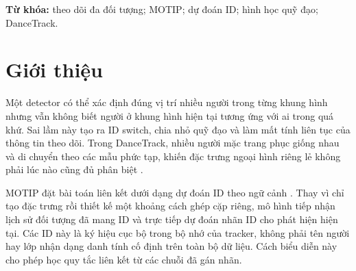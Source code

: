 \begin{abstract}
Theo dõi đa đối tượng đòi hỏi duy trì nhất quán danh tính qua nhiều khung hình, đặc biệt khi các đối tượng có ngoại hình tương tự, giao cắt hoặc bị che khuất. Bài báo này tái hiện phương pháp Multiple Object Tracking as ID Prediction (MOTIP) dựa trên mã nguồn của tác giả, đồng thời đánh giá một nhánh liên kết hình học tường minh. Nhánh bổ sung sử dụng hộp giới hạn của từng ứng viên tại các độ trễ 1, 2, 4 và 8 khung hình để tạo mô tả 66 chiều, sau đó dự đoán điểm tương thích bằng một MLP gồm 25.217 tham số. Điểm hình học được hợp nhất với logit dự đoán ID của MOTIP, trong khi detector được giữ cố định. Thực nghiệm sử dụng các subset lồng nhau chiếm xấp xỉ 5\%, 10\% và 15\% tập huấn luyện DanceTrack, tương ứng 2.090, 4.179 và 6.265 khung hình. Mỗi cấu hình được huấn luyện 10 epoch với ba seed và đánh giá trên toàn bộ 25.508 khung hình validation. Nhánh hình học cải thiện AssA trung bình lần lượt 7.358, 8.821 và 7.525 điểm, với ID switch giảm trong cả chín cặp seed/ngân sách. Kết quả cho thấy hình học đa độ trễ bổ sung một tín hiệu liên kết hữu ích trong các điều kiện được khảo sát. Phạm vi kết luận là học liên kết với detector tiền huấn luyện cố định; thực nghiệm không thay thế đánh giá trên test ẩn hay tái lập toàn bộ chế độ huấn luyện end-to-end của paper gốc.

\end{abstract}
\textbf{Từ khóa:} theo dõi đa đối tượng; MOTIP; dự đoán ID; hình học quỹ đạo; DanceTrack.
\FloatBarrier
\section{Giới thiệu}
Một detector có thể xác định đúng vị trí nhiều người trong từng khung hình nhưng vẫn không biết người ở khung hình hiện tại tương ứng với ai trong quá khứ. Sai lầm này tạo ra ID switch, chia nhỏ quỹ đạo và làm mất tính liên tục của thông tin theo dõi. Trong DanceTrack, nhiều người mặc trang phục giống nhau và di chuyển theo các mẫu phức tạp, khiến đặc trưng ngoại hình riêng lẻ không phải lúc nào cũng đủ phân biệt \cite{dancetrack}.

MOTIP đặt bài toán liên kết dưới dạng dự đoán ID theo ngữ cảnh \cite{motip}. Thay vì chỉ tạo đặc trưng rồi thiết kế một khoảng cách ghép cặp riêng, mô hình tiếp nhận lịch sử đối tượng đã mang ID và trực tiếp dự đoán nhãn ID cho phát hiện hiện tại. Các ID này là ký hiệu cục bộ trong bộ nhớ của tracker, không phải tên người hay lớp nhận dạng danh tính cố định trên toàn bộ dữ liệu. Cách biểu diễn này cho phép học quy tắc liên kết từ các chuỗi đã gán nhãn.

